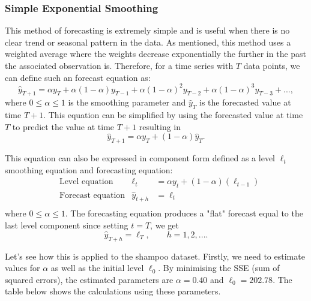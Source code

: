\documentclass{article}
\begin{document}
  \subsubsection{Simple Exponential Smoothing}
  This method of forecasting is extremely simple and is useful when there is no clear trend or seasonal pattern in the data. As mentioned, this method uses a weighted average where the weights decrease exponentially the further in the past the associated observation is. Therefore, for a time series with $T$ data points, we can define such an forecast equation as:
  \begin{equation*}
    \hat{y}_{T+1} = \alpha y_T + \alpha(1-\alpha)y_{T-1} + \alpha(1-\alpha)^2y_{T-2} + \alpha(1-\alpha)^3y_{T-3} + ...,
  \end{equation*}
  where $0 \le \alpha \le 1$ is the smoothing parameter and $\hat{y}_{T}$ is the forecasted value at time $T+1$. This equation can be simplified by using the forecasted value at time $T$ to predict the value at time $T+1$ resulting in
  \begin{equation*}
    \hat{y}_{T+1} = \alpha y_T + (1-\alpha)\hat{y}_{T}.
  \end{equation*}

  This equation can also be expressed in component form defined as a level $\ell_t$ smoothing equation and forecasting equation:
  \begin{align*}
    & \text{Level equation} & \ell_t &= \alpha y_t + (1-\alpha)(\ell_{t-1})  \\
    & \text{Forecast equation} & \hat{y}_{t+h} &= \ell_t \\
  \end{align*}
  where $0 \le \alpha \le 1$. The forecasting equation produces a "flat" forecast equal to the last level component since setting $t=T$, we get
  \begin{equation*}
    \hat{y}_{T+h} = \ell_T, \qquad h=1,2,....
  \end{equation*}
  
  Let's see how this is applied to the shampoo dataset. Firstly, we need to estimate values for $\alpha$ as well as the initial level $\ell_0$. By minimising the SSE (sum of squared errors), the estimated parameters are $\alpha=0.40$ and $\ell_0=202.78$. The table below shows the calculations using these parameters.
\end{document}
